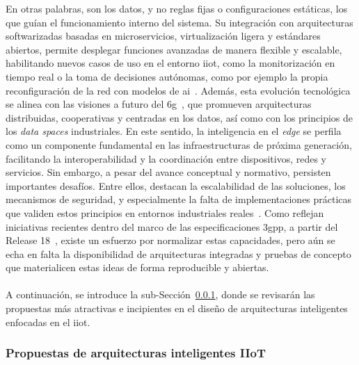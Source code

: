 En otras palabras, son los datos, y no reglas fijas o configuraciones estáticas, los que guían el funcionamiento interno del sistema. Su integración con arquitecturas softwarizadas basadas en microservicios, virtualización ligera y estándares abiertos, permite desplegar funciones avanzadas de manera flexible y escalable, habilitando nuevos casos de uso en el entorno \gls{iiot}, como la monitorización en tiempo real o la toma de decisiones autónomas, como por ejemplo la propia reconfiguración de la red con modelos de \gls{ai}~\cite{rojas2024towards}. Además, esta evolución tecnológica se alinea con las visiones a futuro del \gls{6g}~\cite{uusitalo20216g,jiang2021road}, que promueven arquitecturas distribuidas, cooperativas y centradas en los datos, así como con los principios de los \textit{data spaces} industriales. En este sentido, la inteligencia en el \textit{edge} se perfila como un componente fundamental en las infraestructuras de próxima generación, facilitando la interoperabilidad y la coordinación entre dispositivos, redes y servicios. Sin embargo, a pesar del avance conceptual y normativo, persisten importantes desafíos. Entre ellos, destacan la escalabilidad de las soluciones, los mecanismos de seguridad, y especialmente la falta de implementaciones prácticas que validen estos principios en entornos industriales reales~\cite{onate2023analysis}. Como reflejan iniciativas recientes dentro del marco de las especificaciones \gls{3gpp}, a partir del Release 18~\cite{lin2022overview}, existe un esfuerzo por normalizar estas capacidades, pero aún se echa en falta la disponibilidad de arquitecturas integradas y pruebas de concepto que materialicen estas ideas de forma reproducible y abiertas.\\
\\
A continuación, se introduce la sub-Sección~\ref{subsubsec:propuestas_iiot}, donde se revisarán las propuestas más atractivas e incipientes en el diseño de arquitecturas inteligentes enfocadas en el \gls{iiot}.

\subsubsection{Propuestas de arquitecturas inteligentes IIoT}
\label{subsubsec:propuestas_iiot}

